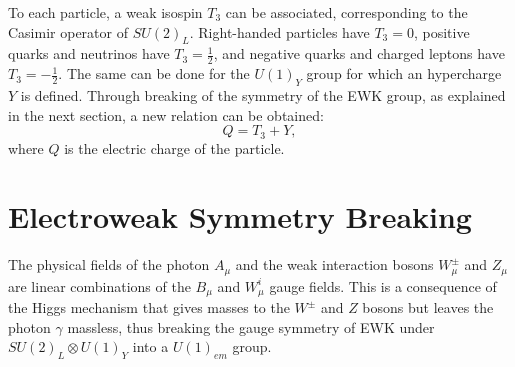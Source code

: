     To each particle, a weak isospin $ T_3 $ can be associated, corresponding to the Casimir operator of $ SU(2)_L $. Right-handed particles have $ T_3 = 0 $, positive quarks and neutrinos have $ T_3 = \frac{1}{2} $, and negative quarks and charged leptons have $ T_3 = - \frac{1}{2} $. The same can be done for the $ U(1)_Y $ group for which an hypercharge $ Y $ is defined. Through breaking of the symmetry of the EWK group, as explained in the next section, a new relation can be obtained:
    \begin{equation}
      Q = T_3 + Y ,
    \end{equation}
    where $ Q $ is the electric charge of the particle.

  \section{Electroweak Symmetry Breaking}

    The physical fields of the photon $ A_\mu $ and the weak interaction bosons $ W^\pm_\mu $ and $ Z_\mu $ are linear combinations of the $ B_\mu $ and $ W^i_\mu $ gauge fields. This is a consequence of the Higgs mechanism that gives masses to the $ W^\pm $ and $ Z $ bosons but leaves the photon $ \gamma $ massless, thus breaking the gauge symmetry of EWK under $ SU(2)_L \otimes U(1)_Y $ into a $ U(1)_{em} $ group. \\

